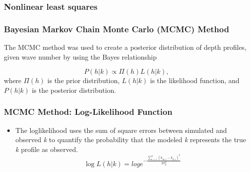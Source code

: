 \documentclass[7pt]{beamer}
\begin{document}
 \begin{frame}
\frametitle{Nonlinear least squares}


\end{frame}


 \begin{frame}
\frametitle{Bayesian Markov Chain Monte Carlo (MCMC) Method}
The MCMC method was used to create a posterior distribution of depth profiles, given wave number by using the Bayes relationship

\begin{equation}\label{bayes}
P(h|%
k) \propto \Pi(h)L(h|%
k),
\end{equation} 
where $\Pi(h)$ is the prior distribution, $L(h|%
k)$ is the likelihood function, and $P(h|%
k)$ is the posterior distribution.
\end{frame}

\begin{frame}
 \frametitle{MCMC Method: Log-Likelihood Function}
\begin{itemize}
\item The loglikelihood uses the sum of square errors between simulated and observed \textit{k} to quantify the probability that the modeled \textit{k} represents the true \textit{k} profile as observed.
\begin{equation} \label{likely}
\log{L(h|%
k)}=log{e^{- \frac{\sum\limits_{i=1}^n({k}_{m,i}-k_{d,i})^2}{2\sigma_{d}^2}}}
\end{equation} 

\end{itemize}
\end{frame}
\end{document}
